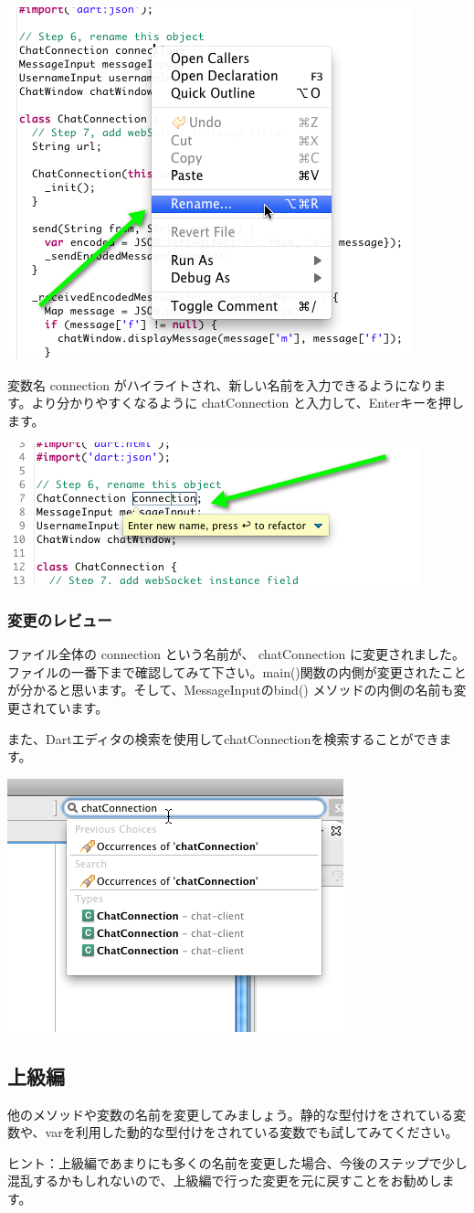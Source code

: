\includegraphics{step6/step6_img1.png}

変数名 connection がハイライトされ、新しい名前を入力できるようになります。より分かりやすくなるように chatConnection と入力して、Enterキーを押します。

\includegraphics{step6/step6_img2.png}

\subsubsection{変更のレビュー}

ファイル全体の connection という名前が、 chatConnection に変更されました。ファイルの一番下まで確認してみて下さい。main()関数の内側が変更されたことが分かると思います。そして、MessageInputのbind() メソッドの内側の名前も変更されています。

また、Dartエディタの検索を使用してchatConnectionを検索することができます。

\includegraphics{step6/step6_img3.png}

\subsection{上級編}

他のメソッドや変数の名前を変更してみましょう。静的な型付けをされている変数や、varを利用した動的な型付けをされている変数でも試してみてください。

ヒント：上級編であまりにも多くの名前を変更した場合、今後のステップで少し混乱するかもしれないので、上級編で行った変更を元に戻すことをお勧めします。
